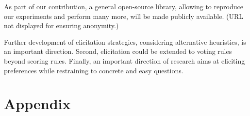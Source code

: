\documentclass{article}
\begin{document}
As part of our contribution, a general open-source library, allowing to reproduce our experiments and perform many more, will be made publicly available. (URL not displayed for ensuring anonymity.)

Further development of elicitation strategies, considering alternative heuristics, is an important direction. 
Second, elicitation could be extended to voting rules beyond scoring rules. 
Finally, an important direction of research  aims at eliciting preferences while restraining to concrete and easy questions.





% 
%

\newpage

{\fontsize{9.7}{10.7}\selectfont }


\newpage
\appendix
\section{Appendix}
\label{sec:appendix}
\newtheorem*{details*}{Strategy Details}
\end{document}
